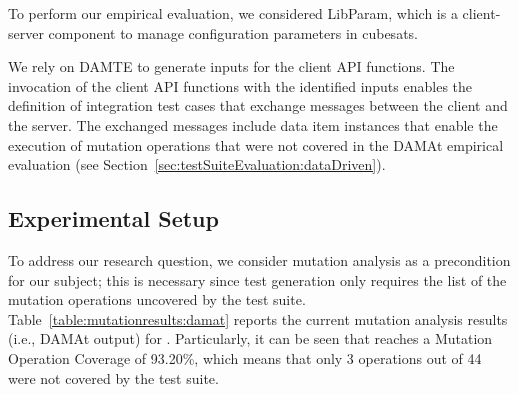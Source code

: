 To perform our empirical evaluation, we considered LibParam, which is a client-server component to manage configuration parameters in cubesats. 

We rely on DAMTE to generate inputs for the \PARAM client API functions. The invocation of the \PARAM client API functions with the identified inputs enables the definition of integration test cases that exchange messages between the \PARAM client and the \PARAM server. The exchanged messages include data item instances that enable the execution of mutation operations that were not covered in the DAMAt empirical evaluation (see Section~\ref{sec:testSuiteEvaluation:dataDriven}).

\subsection{Experimental Setup}

To address our research question, we consider mutation analysis as a precondition for our subject; this is necessary since test generation only requires the list of the mutation operations uncovered by the test suite. Table~\ref{table:mutationresults:damat} reports the current mutation analysis results (i.e., DAMAt output) for \PARAM.
Particularly, it can be seen that \PARAM reaches a Mutation Operation Coverage of 93.20\%, which means that only 3 operations out of 44 were not covered by the test suite.

